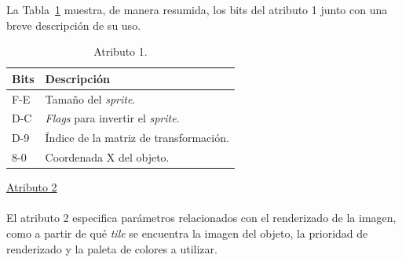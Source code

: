 La Tabla~\ref{tab:sprite_attr1} muestra, de manera resumida, los bits del atributo 1 junto con una breve descripción de su uso.

\begin{table}[h]
	\centering
	\begin{tabular}{| l | l |}
		\hline
		\textbf{Bits} & \textbf{Descripción} \\ \hline
		F-E & Tamaño del \textit{sprite}. \\ \hline
		D-C & \textit{Flags} para invertir el \textit{sprite}. \\ \hline
		D-9 & Índice de la matriz de transformación. \\ \hline
		8-0 & Coordenada X del objeto. \\ \hline
	\end{tabular}
	\caption{Atributo 1.}
	\label{tab:sprite_attr1}
\end{table}
\FloatBarrier{}

\underline{Atributo 2} \\ \\
El atributo 2 especifica parámetros relacionados con el renderizado de la imagen, como a partir de qué \textit{tile} se encuentra la imagen del objeto, la prioridad de renderizado y la paleta de colores a utilizar.

